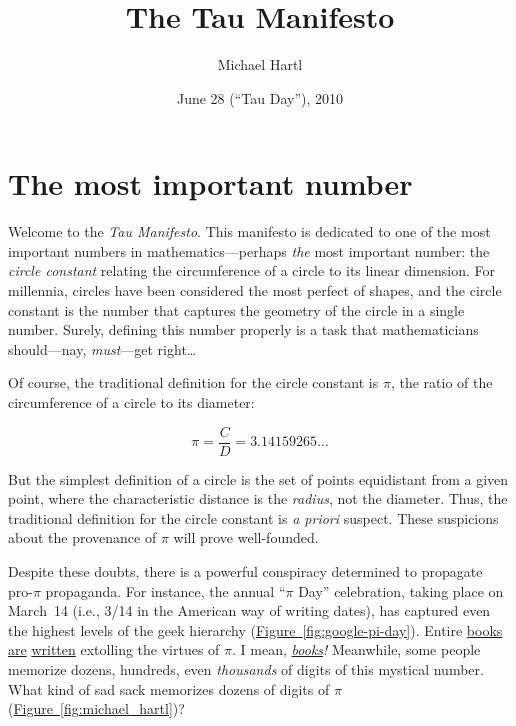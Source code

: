 \documentclass{article}
\begin{document}
\title{The Tau Manifesto}
\author{Michael Hartl}
\date{June 28 (``Tau Day''), 2010}
\maketitle

\section{The most important number} %
\label{sec:the_most_important_number}

Welcome to the \emph{Tau Manifesto}. This manifesto is dedicated to one of the most important numbers in mathematics---perhaps \emph{the} most important number: the \emph{circle constant} relating the circumference of a circle to its linear dimension. For millennia, circles have been considered the most perfect of shapes, and the circle constant is the number that captures the geometry of the circle in a single number. Surely, defining this number properly is a task that mathematicians should---nay, \emph{must}---get right\ldots

Of course, the traditional definition for the circle constant is $\pi$, the ratio of the circumference of a circle to its diameter:

\[
  \pi = \frac{C}{D} = 3.14159265\ldots
\]

\noindent But the simplest definition of a circle is the set of points equidistant from a given point, where the characteristic distance is the \emph{radius}, not the diameter. Thus, the traditional definition for the circle constant is \emph{a priori} suspect. These suspicions about the provenance of $\pi$ will prove well-founded. 

Despite these doubts, there is a powerful conspiracy determined to propagate pro-$\pi$ propaganda. For instance, the annual ``$\pi$ Day'' celebration, taking place on March~14 (i.e., 3/14 in the American way of writing dates), has captured even the highest levels of the geek hierarchy (\hyperref[fig:google-pi-day]{Figure~}\ref{fig:google-pi-day}). Entire \href{http://www.amazon.com/exec/obidos/ISBN=0802713327/parallaxproductiA/}{books} \href{http://www.amazon.com/Pi-Sky-Counting-Thinking-Being/dp/0198539568}{are} \href{http://www.amazon.com/exec/obidos/ISBN=0312381859/parallaxproductiA/}{written} extolling the virtues of $\pi$. I mean, \href{http://www.amazon.com/exec/obidos/ISBN=0387989463/parallaxproductiA/}{\emph{books}}\emph{!} Meanwhile, some people memorize dozens, hundreds, even \emph{thousands} of digits of this mystical number. What kind of sad sack memorizes dozens of digits of $\pi$ (\hyperref[fig:michael_hartl]{Figure~}\ref{fig:michael_hartl})?
\end{document}
